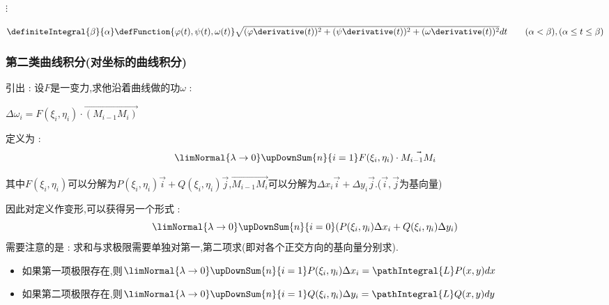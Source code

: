 {{{\begin{enumerate}
{            $\vdots$

            $\definiteIntegral{\beta}{\alpha}\defFunction{\varphi(t),\psi(t),\omega(t)}\sqrt{(\varphi\derivative(t))^2 + (\psi\derivative(t))^2 + (\omega\derivative(t))^2}dt\qquad (\alpha < \beta),(\alpha \leq t \leq \beta)$
            }
    \end{enumerate}
  }%

  \subsubsection{第二类曲线积分(对坐标的曲线积分)}{
    引出 : 设$F$是一变力,求他沿着曲线做的功$\omega$ :

    \begin{center}
      $\Delta\omega_i = F(\xi_i,\eta_i)\cdot\vec{(M_{i-1}M_i)}$
    \end{center}

    定义为 :
    $$
      \limNormal{\lambda \to 0}\upDownSum{n}{i = 1}F(\xi_i,\eta_i)\cdot\vec{M_{i - 1}M_i}
    $$

    其中$F(\xi_i,\eta_i)$可以分解为$P(\xi_i,\eta_i)\vec{i} + Q(\xi_i,\eta_i)\vec{j}$,$\vec{M_{i - 1}M_i}$可以分解为$\Delta x_i\vec{i} + \Delta y_i\vec{j}$.($\vec{i},\vec{j}$为基向量)

    因此对定义作变形,可以获得另一个形式 :
    $$
    \limNormal{\lambda \to 0}\upDownSum{n}{i = 0}(P(\xi_i,\eta_i)\Delta x_i + Q(\xi_i,\eta_i)\Delta y_i)
    $$
    需要注意的是 : 求和与求极限需要单独对第一,第二项求(即对各个正交方向的基向量分别求).

    \begin{itemize}
      \item 如果第一项极限存在,则$\limNormal{\lambda \to 0}\upDownSum{n}{i = 1}P(\xi_i,\eta_i)\Delta x_i = \pathIntegral{L}P(x,y)dx$
      \item 如果第二项极限存在,则$\limNormal{\lambda \to 0}\upDownSum{n}{i = 1}Q(\xi_i,\eta_i)\Delta y_i = \pathIntegral{L}Q(x,y)dy$
    \end{itemize}

}}}
